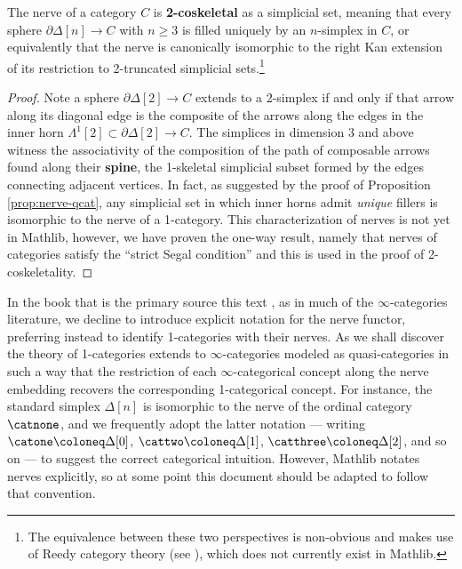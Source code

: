  \begin{proposition}\label{prop:nerve-2-coskeletal}
  \leanok
 The nerve of a category $C$ is \textbf{2-coskeletal} as a simplicial set, meaning that every sphere $\partial\Delta[n] \to C$ with $n \geq 3$ is filled uniquely by an $n$-simplex in $C$, or equivalently that the nerve is canonically isomorphic to the right Kan extension of its restriction to 2-truncated simplicial sets.\footnote{The equivalence between these two perspectives is non-obvious and makes use of Reedy category theory (see \cite[\S C.4-5]{RiehlVerity:2022eo}), which does not currently exist in Mathlib.}%
 \end{proposition}
\begin{proof}
  \leanok
  Note a sphere $\partial\Delta[2] \to C$ extends to a 2-simplex if and only if that arrow along its diagonal edge is the composite of the arrows along the edges in the inner horn $\Lambda^1[2] \subset \partial\Delta[2] \to C$. The simplices in dimension 3 and above witness the associativity of the composition of the path of composable arrows found along their  \textbf{spine}, the 1-skeletal simplicial subset formed by the edges connecting adjacent vertices. In fact, as suggested by the proof of Proposition \ref{prop:nerve-qcat}, any simplicial set in which inner horns admit \emph{unique} fillers is isomorphic to the nerve of a 1-category. This characterization of nerves is not yet in Mathlib, however, we have proven the one-way result, namely that nerves of categories satisfy the ``strict Segal condition'' and this is used in the proof of 2-coskeletality.
\end{proof} %

 In the book that is the primary source this text \cite{RiehlVerity:2022eo}, as in much of the $\infty$-categories literature, we decline to introduce explicit notation for the nerve functor, preferring instead to identify 1-categories with their nerves. As we shall discover the theory of 1-categories extends to $\infty$-categories modeled as quasi-categories in such a way that the restriction of each $\infty$-categorical concept along the nerve embedding recovers the corresponding 1-categorical concept. For instance, the standard simplex $\Delta[n]$ is isomorphic to the nerve of the ordinal category $\catnone$, and we frequently adopt the latter notation --- writing $\catone \coloneq \Delta[0]$, $\cattwo \coloneq \Delta[1]$, $\catthree \coloneq \Delta[2]$, and so on --- to suggest the correct categorical intuition. However, Mathlib notates nerves explicitly, so at some point this document should be adapted to follow that convention.

